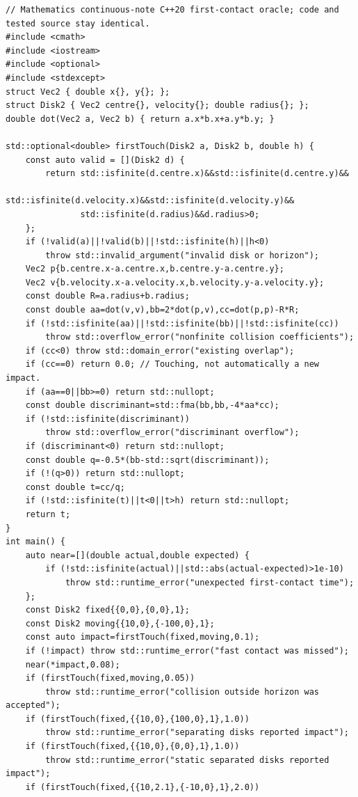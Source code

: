 \begin{verbatim}
// Mathematics continuous-note C++20 first-contact oracle; code and tested source stay identical.
#include <cmath>
#include <iostream>
#include <optional>
#include <stdexcept>
struct Vec2 { double x{}, y{}; };
struct Disk2 { Vec2 centre{}, velocity{}; double radius{}; };
double dot(Vec2 a, Vec2 b) { return a.x*b.x+a.y*b.y; }

std::optional<double> firstTouch(Disk2 a, Disk2 b, double h) {
    const auto valid = [](Disk2 d) {
        return std::isfinite(d.centre.x)&&std::isfinite(d.centre.y)&&
               std::isfinite(d.velocity.x)&&std::isfinite(d.velocity.y)&&
               std::isfinite(d.radius)&&d.radius>0;
    };
    if (!valid(a)||!valid(b)||!std::isfinite(h)||h<0)
        throw std::invalid_argument("invalid disk or horizon");
    Vec2 p{b.centre.x-a.centre.x,b.centre.y-a.centre.y};
    Vec2 v{b.velocity.x-a.velocity.x,b.velocity.y-a.velocity.y};
    const double R=a.radius+b.radius;
    const double aa=dot(v,v),bb=2*dot(p,v),cc=dot(p,p)-R*R;
    if (!std::isfinite(aa)||!std::isfinite(bb)||!std::isfinite(cc))
        throw std::overflow_error("nonfinite collision coefficients");
    if (cc<0) throw std::domain_error("existing overlap");
    if (cc==0) return 0.0; // Touching, not automatically a new impact.
    if (aa==0||bb>=0) return std::nullopt;
    const double discriminant=std::fma(bb,bb,-4*aa*cc);
    if (!std::isfinite(discriminant))
        throw std::overflow_error("discriminant overflow");
    if (discriminant<0) return std::nullopt;
    const double q=-0.5*(bb-std::sqrt(discriminant));
    if (!(q>0)) return std::nullopt;
    const double t=cc/q;
    if (!std::isfinite(t)||t<0||t>h) return std::nullopt;
    return t;
}
int main() {
    auto near=[](double actual,double expected) {
        if (!std::isfinite(actual)||std::abs(actual-expected)>1e-10)
            throw std::runtime_error("unexpected first-contact time");
    };
    const Disk2 fixed{{0,0},{0,0},1};
    const Disk2 moving{{10,0},{-100,0},1};
    const auto impact=firstTouch(fixed,moving,0.1);
    if (!impact) throw std::runtime_error("fast contact was missed");
    near(*impact,0.08);
    if (firstTouch(fixed,moving,0.05))
        throw std::runtime_error("collision outside horizon was accepted");
    if (firstTouch(fixed,{{10,0},{100,0},1},1.0))
        throw std::runtime_error("separating disks reported impact");
    if (firstTouch(fixed,{{10,0},{0,0},1},1.0))
        throw std::runtime_error("static separated disks reported impact");
    if (firstTouch(fixed,{{10,2.1},{-10,0},1},2.0))

\end{verbatim}
